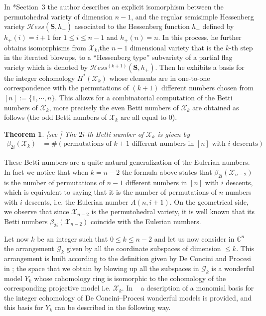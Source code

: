 \documentclass[a4paper]{amsart}
\newcommand{\Hess}{\mathcal Hess}
\newcommand{\cX}{\mathcal X}
\newcommand{\bS}{\mathbf {S}}
\newtheorem{theorem}{Theorem}[section]
\theoremstyle{definition}
\theoremstyle{remark}
\numberwithin{equation}{section}
\begin{document}
In \cite{Lin24}*{Section~3}  the author describes an explicit isomorphism between  the permutohedral variety  of dimension $n-1$, and the regular semisimple Hessenberg variety $\Hess(\bS,h_+)$ associated to the Hessenberg function $h_+$ defined by $h_+(i)=i+1$ for $1\le i\le n-1$ and $h_+(n)=n$.
In this process, he further obtains isomorphisms from $\cX_k$,the $n-1$ dimensional variety that is the $k$-th step in the iterated blowups, to a ``Hessenberg type'' subvariety of a partial flag variety which is denoted by $\Hess^{(k+1)}(\bS,h_+)$.
Then he exhibits a basis for the integer cohomology $H^*(\cX_k)$ whose elements are in one-to-one correspondence with the permutations of $(k+1)$ different numbers chosen from $[n]:=\{1,\cdots,n\}$. This allows for a combinatorial computation of the Betti numbers of $\cX_k$, more precisely  the even Betti numbers of $\cX_k$ are obtained as follows (the odd Betti numbers of $\cX_{k}$ are all equal to $0$).

\begin{theorem}\label{thm:Lin} [see \cite{Lin24}]
The $2i$-th Betti number of $\cX_{k}$ is given by
	\begin{align*}
		\beta_{2i}(\cX_{k})&= \# (\text{permutations of $k+1$ different numbers in $[n]$ with $i$ descents})%
	\end{align*}
\end{theorem}
These Betti numbers are a quite natural generalization of the Eulerian numbers. In fact  we notice that when \(k=n-2\) the formula  above states that $\beta_{2i}(\cX_{n-2})$ is the number of permutations of \(n-1\) different numbers in $[n]$ with \(i\) descents, which is equivalent to saying  that it is the number of permutations of \(n\) numbers with \(i\) descents, i.e. the Eulerian number $A(n,i+1)$. On the geometrical side, we observe that since $\cX_{n-2}$ is the permutohedral variety, it is well known that its Betti numbers $\beta_{2i}(\cX_{n-2})$ coincide with  the Eulerian numbers. 

Let now \(k\) be an integer such that \(0\leq k\leq n-2\) and let us now consider in $\mathbb C^n$ the  arrangement \(\mathcal G_k\) given by all the coordinate subspaces of dimension \(\leq k\). This arrangement is built according to the definition given  by De Concini and Procesi in \cite{wonderful1};  the space that we obtain by blowing up all the subspaces in \(\mathcal G_k\) is a wonderful model $Y_{k}$ whose cohomology ring is isomorphic to  the cohomology of the corresponding projective model   i.e. $\cX_{k}$.  In  ~\cite{gaiffiselecta} a description of  a monomial basis  for the integer cohomology of De Concini--Procesi wonderful models is provided, and this basis for $Y_k$ can be described in the following way.
\end{document}
